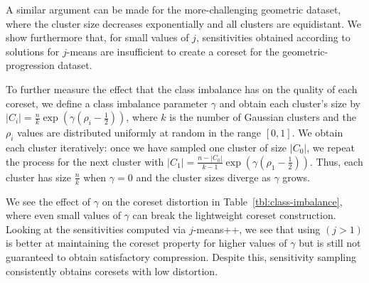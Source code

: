 A similar argument can be made for the more-challenging geometric dataset, where the cluster size decreases exponentially and all clusters are equidistant.
We show furthermore that, for small values of $j$, sensitivities obtained according to
solutions for $j$-means are insufficient to create a coreset for the geometric-progression dataset.

To further measure the effect that the class imbalance has on the quality of each coreset, we define a class imbalance parameter $\gamma$ and obtain each
cluster's size by $|C_i| = \frac{n}{k} \exp \left( \gamma(\rho_i - \frac{1}{2}) \right)$, where $k$ is the number of Gaussian clusters and the $\rho_i$ values
are distributed uniformly at random in the range $[0, 1]$.  We obtain each cluster iteratively: once we have sampled one cluster of size $|C_0|$, we repeat the
process for the next cluster with $|C_1| = \frac{n - |C_0|}{k-1}\exp \left( \gamma(\rho_1 - \frac{1}{2}) \right)$.  Thus, each cluster has size $\frac{n}{k}$
when $\gamma = 0$ and the cluster sizes diverge as $\gamma$ grows. 


We see the effect of $\gamma$ on the coreset distortion in Table~\ref{tbl:class-imbalance}, where even
small values of $\gamma$ can break the lightweight coreset construction.   Looking at the sensitivities computed via $j$-means++, we see that using $(j>1)$ is better at maintaining the coreset
property for higher values of $\gamma$ but is still not guaranteed to obtain satisfactory compression. Despite this, sensitivity sampling consistently obtains
coresets with low distortion.


